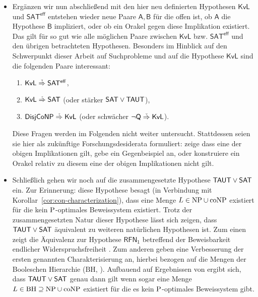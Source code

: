 \begin{itemize}[parsep=0pt,listparindent=\parindent,itemsep=5pt plus 1pt minus 1pt,midpenalty=0]
    \item Ergänzen wir nun abschließend mit den hier neu definierten Hypothesen $\mathsf{KvL}$ und $\mathsf{SAT^{eff}}$ entstehen wieder neue Paare $\mathsf{A,B}$ für die offen ist, ob $\mathsf A$ die Hypothese $\mathsf B$ impliziert, oder ob ein Orakel gegen diese Implikation existiert. Das gilt für so gut wie alle möglichen Paare zwischen $\mathsf{KvL}$ bzw. $\mathsf{SAT^{eff}}$ und den übrigen betrachteten Hypothesen. 
        Besonders im Hinblick auf den Schwerpunkt dieser Arbeit auf Suchprobleme und auf die Hypothese $\mathsf{KvL}$ sind die folgenden Paare interessant:
        \begin{enumerate}[noitemsep,resume,label=(\roman*)]
            \item $\mathsf{KvL}\stackrel{\smash{\text{\raisebox{-1pt}{\tiny ?}}}}{\Rightarrow}\mathsf{SAT^{eff}}$,
            \item $\mathsf{KvL}\stackrel{\smash{\text{\raisebox{-1pt}{\tiny ?}}}}{\Rightarrow}\hSAT$ (oder stärker $\hSAT\lor\hTAUT$),
            \item $\hDisjCoNP\stackrel{\smash{\text{\raisebox{-1pt}{\tiny ?}}}}{\Rightarrow}\mathsf{KvL}$ (oder schwächer $\neg\hQ\stackrel{\smash{\text{\raisebox{-1pt}{\tiny ?}}}}{\Rightarrow}\mathsf{KvL}$).
        \end{enumerate}
        Diese Fragen werden im Folgenden nicht weiter untersucht. Stattdessen seien sie hier als zukünftige Forschungsdesiderata formuliert: zeige dass eine der obigen Implikationen gilt, gebe ein Gegenbeispiel an, oder konstruiere ein Orakel relativ zu diesem eine der obigen Implikationen nicht gilt.

    \item Schließlich gehen wir noch auf die zusammengesetzte Hypothese $\hTAUT\lor\hSAT$ ein. Zur Erinnerung: diese Hypothese besagt (in Verbindung mit Korollar~\ref{cor:con-characterization}), dass eine Menge $L\in\NP\cup\coNP$ existiert für die kein $\P$-optimales Beweissystem existiert.
        Trotz der zusammengesetzten Natur dieser Hypothese lässt sich zeigen, dass $\hTAUT\lor\hSAT$ äquivalent zu weiteren natürlichen Hypothesen ist.
        Zum einen zeigt \textcite[Thm.~3.2]{khaniki_new_2022} die Äquivalenz zur Hypothese $\mathsf{RFN_1}$ betreffend der Beweisbarkeit endlicher Widerspruchsfreiheit \parencites(vgl.){pudlak_incompleteness_2017}.
        Zum anderen geben \textcite{egidy_upward_2023} eine Verbesserung der ersten genannten Charakterisierung an, hierbei bezogen auf die Mengen der Booleschen Hierarchie ($\mathrm{BH}$, \cites(vgl.)(){cai_boolean_1986}{cai_boolean_1988}{cai_boolean_1989}). Aufbauend auf Ergebnissen von \textcite{kobler_optimal_2003} ergibt sich, dass $\hTAUT\lor\hSAT$ genau dann gilt wenn sogar eine Menge $L \in \mathrm{BH}\supseteq \NP\cup\coNP$ existiert für die es kein $\P$-optimales Beweissystem gibt.


\end{itemize}
